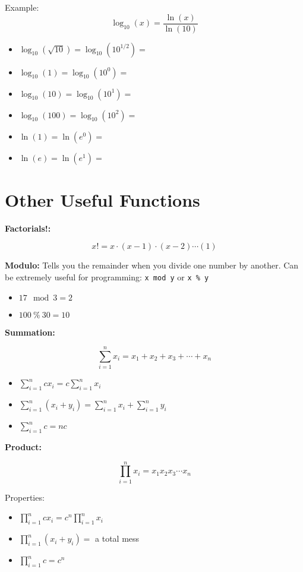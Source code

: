 \documentclass[]{book}
\providecommand{\tightlist}{%
  \setlength{\itemsep}{0pt}\setlength{\parskip}{0pt}}
\theoremstyle{definition}
\theoremstyle{definition}
\theoremstyle{definition}
\theoremstyle{remark}
\begin{document}
Example: \[\log_{10}(x) = \frac{\ln(x)}{\ln(10)}\]

\begin{itemize}
\item $\log_{10}(\sqrt{10})=\log_{10}(10^{1/2}) = $
\item $\log_{10}(1)=\log_{10}(10^{0}) = $
\item $\log_{10}(10)=\log_{10}(10^{1}) = $
\item $\log_{10}(100)=\log_{10}(10^{2}) = $
\item $\ln(1)=\ln(e^{0}) = $
\item $\ln(e)=\ln(e^{1}) = $
\end{itemize}

\section{Other Useful Functions}\label{other-useful-functions}

\textbf{Factorials!:}

\[x! = x\cdot (x-1) \cdot (x-2) \cdots (1)\]

\textbf{Modulo:} Tells you the remainder when you divide one number by
another. Can be extremely useful for programming: \texttt{x mod y} or
\texttt{x \% y}

\begin{itemize}
\tightlist
\item
  \(17 \mod 3 = 2\)
\item
  \(100 \ \% \ 30 = 10\)
\end{itemize}

\textbf{Summation:}

\[\sum\limits_{i=1}^n x_i = x_1+x_2+x_3+\cdots+x_n\]

\begin{itemize}
\item $\sum\limits_{i=1}^n c x_i = c \sum\limits_{i=1}^n x_i $
\item $\sum\limits_{i=1}^n (x_i + y_i) =  \sum\limits_{i=1}^n x_i + \sum\limits_{i=1}^n y_i $
\item $\sum\limits_{i=1}^n c = n c $
\end{itemize}

\textbf{Product:}

\[\prod\limits_{i=1}^n x_i = x_1 x_2 x_3 \cdots x_n\]

Properties:

\begin{itemize}
\item $\prod\limits_{i=1}^n c x_i = c^n \prod\limits_{i=1}^n x_i $
\item $\prod\limits_{i=1}^n (x_i + y_i) =$ a total mess
\item $\prod\limits_{i=1}^n c = c^n $
\end{itemize}
\end{document}
